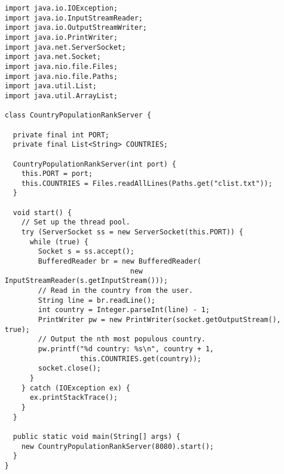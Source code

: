 \begin{lstlisting}[language=MyJava]
import java.io.IOException;
import java.io.InputStreamReader;
import java.io.OutputStreamWriter;
import java.io.PrintWriter;
import java.net.ServerSocket;
import java.net.Socket;
import java.nio.file.Files;
import java.nio.file.Paths;
import java.util.List;
import java.util.ArrayList;

class CountryPopulationRankServer {

  private final int PORT;
  private final List<String> COUNTRIES;

  CountryPopulationRankServer(int port) {
    this.PORT = port;
    this.COUNTRIES = Files.readAllLines(Paths.get("clist.txt"));
  }

  void start() {
    // Set up the thread pool.
    try (ServerSocket ss = new ServerSocket(this.PORT)) {
      while (true) {
        Socket s = ss.accept();
        BufferedReader br = new BufferedReader(
                              new InputStreamReader(s.getInputStream()));
        // Read in the country from the user.
        String line = br.readLine();
        int country = Integer.parseInt(line) - 1;
        PrintWriter pw = new PrintWriter(socket.getOutputStream(), true);
        // Output the nth most populous country.
        pw.printf("%d country: %s\n", country + 1, 
                  this.COUNTRIES.get(country));
        socket.close();
      }
    } catch (IOException ex) { 
      ex.printStackTrace(); 
    }
  }

  public static void main(String[] args) {
    new CountryPopulationRankServer(8080).start();
  }
}
\end{lstlisting}

